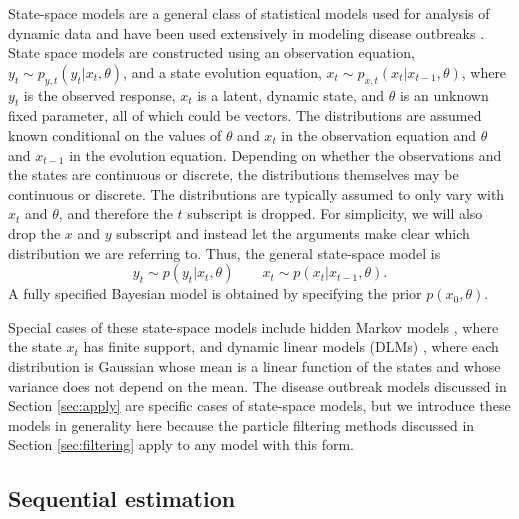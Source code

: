 \documentclass{elsarticle}
\begin{document}
State-space models are a general class of statistical models used for analysis of dynamic data and have been used extensively in modeling disease outbreaks \citep{Mart:Cone:Lope:Lope:baye:2008,watkins2009disease,merl2009statistical,ludkovski2010optimal,skvortsov2012monitoring}.  State space models are constructed using an observation equation, $y_t \sim p_{y,t}(y_t|x_t,\theta)$, and a state evolution equation, $x_t \sim p_{x,t}(x_t|x_{t-1},\theta)$, where $y_t$ is the observed response, $x_t$ is a latent, dynamic state, and $\theta$ is an unknown fixed parameter, all of which could be vectors. The distributions are assumed known conditional on the values of $\theta$ and $x_t$ in the observation equation and $\theta$ and $x_{t-1}$ in the evolution equation. Depending on whether the observations and the states are continuous or discrete, the distributions themselves may be continuous or discrete. The distributions are typically assumed to only vary with $x_t$ and $\theta$, and therefore the $t$ subscript is dropped.
For simplicity, we will also drop the $x$ and $y$ subscript and instead let the arguments make clear which distribution we are referring to. Thus, the general state-space model is
\[
y_t \sim p(y_t|x_t,\theta) \qquad
x_t \sim p(x_t|x_{t-1},\theta).
\]
A fully specified Bayesian model is obtained by specifying the prior $p(x_0,\theta)$.

Special cases of these state-space models include hidden Markov models \citep{cappe2005inference}, where the state $x_t$ has finite support, and dynamic linear models (DLMs) \citep{West:Harr:baye:1997}, where each distribution is Gaussian whose mean is a linear function of the states and whose variance does not depend on the mean. The disease outbreak models discussed in Section \ref{sec:apply} are specific cases of state-space models, but we introduce these models in generality here because the particle filtering methods discussed in Section \ref{sec:filtering} apply to any model with this form.

\subsection{Sequential estimation \label {sec:sequential}}
\end{document}
